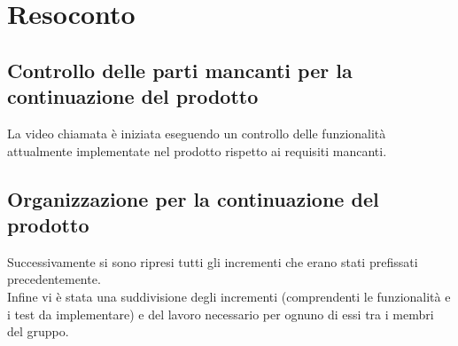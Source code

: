 \section{Resoconto}
\subsection{Controllo delle parti mancanti per la continuazione del prodotto}
La video chiamata è iniziata eseguendo un controllo delle funzionalità attualmente implementate nel prodotto rispetto ai requisiti mancanti.\\
\subsection{Organizzazione per la continuazione del prodotto}
Successivamente si sono ripresi tutti gli incrementi che erano stati prefissati precedentemente.\\
Infine vi è stata una suddivisione degli incrementi (comprendenti le funzionalità e i test da implementare) e del lavoro necessario per ognuno di essi tra i membri del gruppo.